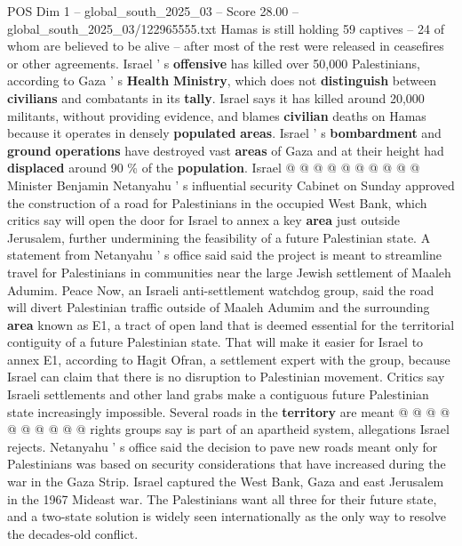 \begin{textsample}{POS Dim 1 – global\_south\_2025\_03 – Score 28.00 – global\_south\_2025\_03/122965555.txt}
Hamas is still holding 59 captives -- 24 of whom are believed to be alive -- after most of the rest were released in ceasefires or other agreements.
Israel ' s \textbf{offensive} has killed over 50,000 Palestinians, according to Gaza ' s \textbf{Health} \textbf{Ministry}, which does not \textbf{distinguish} between \textbf{civilians} and combatants in its \textbf{tally}.
Israel says it has killed around 20,000 militants, without providing evidence, and blames \textbf{civilian} deaths on Hamas because it operates in densely \textbf{populated} \textbf{areas}.
Israel ' s \textbf{bombardment} and \textbf{ground} \textbf{operations} have destroyed vast \textbf{areas} of Gaza and at their height had \textbf{displaced} around 90 \% of the \textbf{population}.
Israel @ @ @ @ @ @ @ @ @ @ Minister Benjamin Netanyahu ' s influential security Cabinet on Sunday approved the construction of a road for Palestinians in the occupied West Bank, which critics say will open the door for Israel to annex a key \textbf{area} just outside Jerusalem, further undermining the feasibility of a future Palestinian state.
A statement from Netanyahu ' s office said said the project is meant to streamline travel for Palestinians in communities near the large Jewish settlement of Maaleh Adumim.
Peace Now, an Israeli anti-settlement watchdog group, said the road will divert Palestinian traffic outside of Maaleh Adumim and the surrounding \textbf{area} known as E1, a tract of open land that is deemed essential for the territorial contiguity of a future Palestinian state.
That will make it easier for Israel to annex E1, according to Hagit Ofran, a settlement expert with the group, because Israel can claim that there is no disruption to Palestinian movement.
Critics say Israeli settlements and other land grabs make a contiguous future Palestinian state increasingly impossible.
Several roads in the \textbf{territory} are meant @ @ @ @ @ @ @ @ @ @ rights groups say is part of an apartheid system, allegations Israel rejects.
Netanyahu ' s office said the decision to pave new roads meant only for Palestinians was based on security considerations that have increased during the war in the Gaza Strip.
Israel captured the West Bank, Gaza and east Jerusalem in the 1967 Mideast war.
The Palestinians want all three for their future state, and a two-state solution is widely seen internationally as the only way to resolve the decades-old conflict.

\end{textsample}
